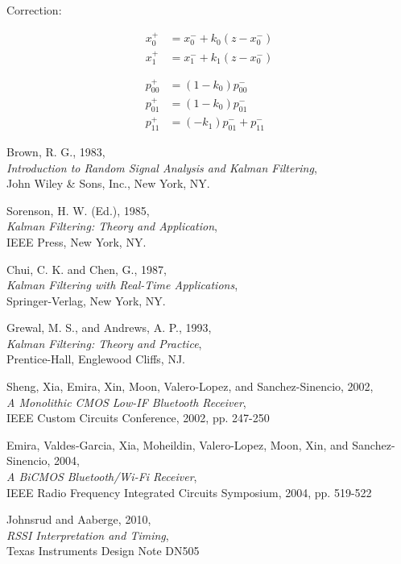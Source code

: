 \documentclass[12pt]{article}
\begin{document}
Correction:

\begin{equation*}
    \begin{aligned}
    x_0^+ &= x_0^- + k_0 (z - x_0^-) \\
    x_1^+ &= x_1^- + k_1 (z - x_0^-) \\
    \phantom{m} \\
    p_{00}^+ &= (1 - k_0)p_{00}^- \\
    p_{01}^+ &= (1 - k_0)p_{01}^- \\
    p_{11}^+ &= (- k_1)p_{01}^- + p_{11}^-
    \end{aligned}
\end{equation*}



%
%

\clearpage

\renewcommand{\refname}{Appendix B - General References}

\begin{thebibliography}{9}

Brown, R. G., 1983, \\
\emph{Introduction to Random Signal Analysis and Kalman Filtering}, \\
John Wiley \& Sons, Inc., New York, NY.

Sorenson, H. W. (Ed.), 1985, \\
\emph{Kalman Filtering: Theory and Application}, \\
IEEE Press, New York, NY.

Chui, C. K. and Chen, G., 1987, \\
\emph{Kalman Filtering with Real-Time Applications}, \\
Springer-Verlag, New York, NY.

Grewal, M. S., and Andrews, A. P., 1993, \\
\emph{Kalman Filtering: Theory and Practice}, \\
Prentice-Hall, Englewood Cliffs, NJ.

Sheng, Xia, Emira, Xin, Moon, Valero-Lopez, and Sanchez-Sinencio, 2002, \\
\emph{A Monolithic CMOS Low-IF Bluetooth Receiver}, \\
IEEE Custom Circuits Conference, 2002, pp. 247-250

Emira, Valdes-Garcia, Xia, Moheildin, Valero-Lopez, Moon, Xin, and Sanchez-Sinencio, 2004, \\
\emph{A BiCMOS Bluetooth/Wi-Fi Receiver}, \\
IEEE Radio Frequency Integrated Circuits Symposium, 2004, pp. 519-522

Johnsrud and Aaberge, 2010, \\
\emph{RSSI Interpretation and Timing}, \\
Texas Instruments Design Note DN505

\end{thebibliography}
\end{document}
